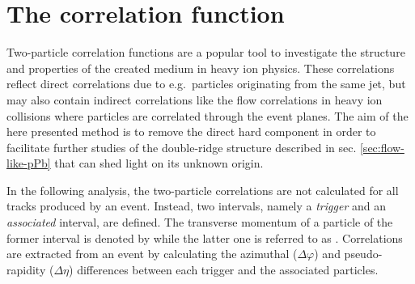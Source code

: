 \section{The correlation function}
\label{sec:correlation_function}

Two-particle correlation functions are a popular tool to investigate the structure and properties of the created medium in heavy ion physics. These correlations reflect direct correlations due to e.g.\ particles originating from the same jet, but may also contain indirect correlations like the flow correlations in heavy ion collisions where particles are correlated through the event planes. The aim of the here presented method is to remove the direct hard component in order to facilitate further studies of the double-ridge structure described in sec. \ref{sec:flow-like-pPb} that can shed light on its unknown origin.


In the following analysis, the two-particle correlations are not calculated for all tracks produced by an event. Instead, two \pt intervals, namely a \emph{trigger} and an \emph{associated} interval, are defined. The transverse momentum of a particle of the former interval is denoted by \pttrig while the latter one is referred to as \ptassoc. Correlations are extracted from an event by calculating the azimuthal ($\Delta\varphi$) and pseudo-rapidity ($\Delta \eta$) differences between each trigger and the associated particles.

